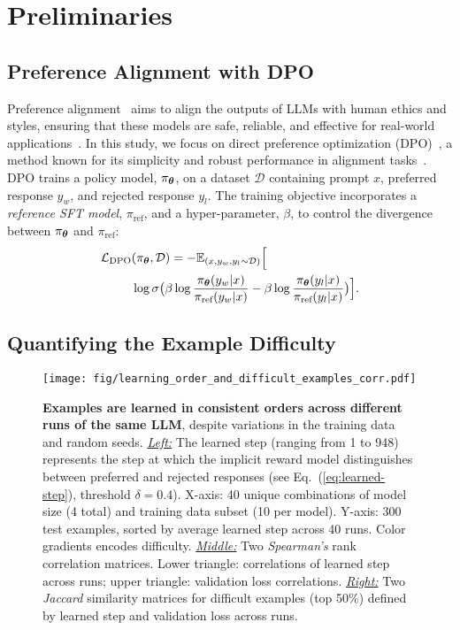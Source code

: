 \section{Preliminaries}
\label{sec:preliminaries}

\subsection{Preference Alignment with DPO} 

Preference alignment~\cite{ouyang2022training} aims to align the outputs of LLMs with human ethics and styles, ensuring that these models are safe, reliable, and effective for real-world applications~\cite{christiano2017deep}. In this study, we focus on direct preference optimization (DPO)~\cite{rafailov2024direct}, a method known for its simplicity and robust performance in alignment tasks~\cite{dubey2024llama}. 
DPO trains a policy model, $\pi_{\bm{\theta}}$, on a dataset $\mathcal{D}$ containing prompt $x$, preferred response $y_w$, and rejected response $y_l$. The training objective incorporates a \textit{reference SFT model}, $\pi_{\text{ref}}$, and a hyper-parameter, $\beta$, to control the divergence between $\pi_{\bm{\theta}}$ and $\pi_{\text{ref}}$:
\begin{align}
    \label{eq:dpo_loss}
    \mathcal{L}_{\text{DPO}}&(\pi_{\bm{\theta}}, \mathcal{D}) = - \mathbb{E}_{(x, y_w, y_l \sim \mathcal{D})} \Big[ \\ \nonumber  &\log \sigma \big(\beta \log\frac{\pi_{\bm{\theta}} (y_w | x)}{\pi_{\text{ref}}(y_w |x)} - \beta \log\frac{\pi_{\bm{\theta}}(y_l | x)}{\pi_{\text{ref}}(y_l |x)} \big) \Big].
\end{align}

\subsection{Quantifying the Example Difficulty}
\label{sec:difficulty_measurement}
\begin{figure*}[!htp]
    \centering
    \texttt{[image: fig/learning\_order\_and\_difficult\_examples\_corr.pdf]}
    \vspace{-0.4cm}
    \caption{\textbf{Examples are learned in consistent orders across different runs of the same LLM}, despite variations in the training data and random seeds. \underline{\textit{Left:}} The learned step (ranging from 1 to 948) represents the step at which the implicit reward model distinguishes between preferred and rejected responses (see Eq.~(\ref{eq:learned-step}), threshold $\delta=0.4$). X-axis: 40 unique combinations of model size (4 total) and training data subset (10 per model). Y-axis: 300 test examples, sorted by average learned step across 40 runs.  Color gradients encodes difficulty. 
    \textit{\underline{Middle:}} Two \textit{Spearman's} rank correlation matrices. Lower triangle: correlations of learned step across runs; upper triangle: validation loss correlations. 
    \textit{\underline{Right:}} Two \textit{Jaccard} similarity matrices for difficult examples (top 50\%) defined by learned step and validation loss across runs.
    }
    \label{fig:implicit_curricula}
    \vspace{-0.1cm}
\end{figure*}


